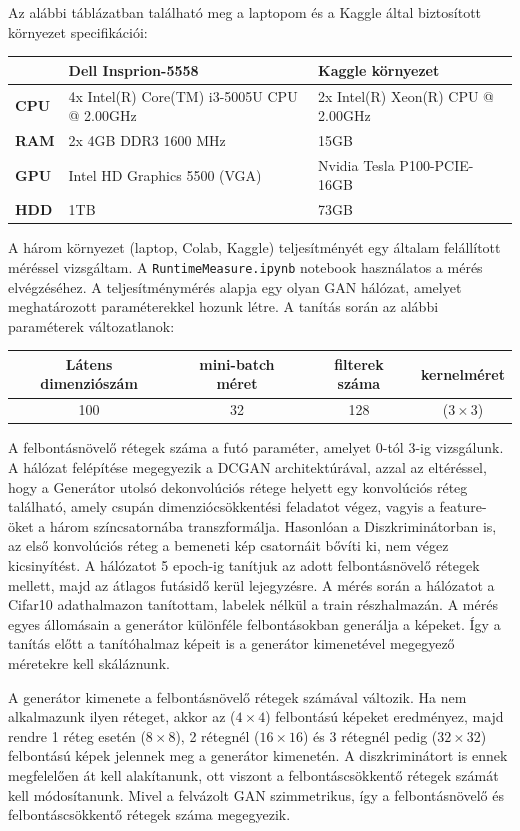 Az alábbi táblázatban található meg a laptopom és a Kaggle által biztosított környezet specifikációi:
\begin{center}
\begin{tabular}{ p{1.2cm}||p{6cm}|p{6cm}  }
	  & Dell Insprion-5558 & Kaggle környezet\\
	\hline
	\textbf{CPU} & 4x Intel(R) Core(TM) i3-5005U CPU @ 2.00GHz & 2x Intel(R) Xeon(R) CPU @ 2.00GHz\\
	\textbf{RAM} & 2x 4GB DDR3 1600 MHz & 15GB\\
	\textbf{GPU} & Intel HD Graphics 5500 (VGA) & Nvidia Tesla P100-PCIE-16GB\\
	\textbf{HDD} & 1TB & 73GB
\end{tabular}
\end{center}
A három környezet (laptop, Colab, Kaggle) teljesítményét egy általam felállított méréssel vizsgáltam.
A \texttt{RuntimeMeasure.ipynb} notebook használatos a mérés elvégzéséhez.
A teljesítménymérés alapja egy olyan GAN hálózat, amelyet meghatározott paraméterekkel hozunk létre.
A tanítás során az alábbi paraméterek változatlanok:
\begin{center}
\begin{tabular}{ c|c|c|c }
	Látens dimenziószám & mini-batch méret & filterek száma & kernelméret\\
	\hline
	100 & 32 & 128 & ($3\times 3$)
\end{tabular}
\end{center}
A felbontásnövelő rétegek száma a futó paraméter, amelyet 0-tól 3-ig vizsgálunk.
A hálózat felépítése megegyezik a DCGAN architektúrával, azzal az eltéréssel, hogy a Generátor utolsó dekonvolúciós rétege helyett egy konvolúciós réteg található, amely csupán dimenziócsökkentési feladatot végez, vagyis a feature-öket a három színcsatornába transzformálja. Hasonlóan a Diszkriminátorban is, az első konvolúciós réteg a bemeneti kép csatornáit bővíti ki, nem végez kicsinyítést.
A hálózatot 5 epoch-ig tanítjuk az adott felbontásnövelő rétegek mellett, majd az átlagos futásidő kerül lejegyzésre.
A mérés során a hálózatot a Cifar10 \cite{krizhevsky2009learning} adathalmazon tanítottam, labelek nélkül a train részhalmazán.
A mérés egyes állomásain a generátor különféle felbontásokban generálja a képeket. Így a tanítás előtt a tanítóhalmaz képeit is a generátor kimenetével megegyező méretekre kell skáláznunk.

A generátor kimenete a felbontásnövelő rétegek számával változik. Ha nem alkalmazunk ilyen réteget, akkor az ($4 \times 4$) felbontású képeket eredményez, majd rendre 1 réteg esetén ($8 \times 8$), 2 rétegnél ($16 \times 16$) és 3 rétegnél pedig ($32 \times 32$) felbontású képek jelennek meg a generátor kimenetén. A diszkriminátort is ennek megfelelően át kell alakítanunk, ott viszont a felbontáscsökkentő rétegek számát kell módosítanunk. Mivel a felvázolt GAN szimmetrikus, így a felbontásnövelő és felbontáscsökkentő rétegek száma megegyezik.

